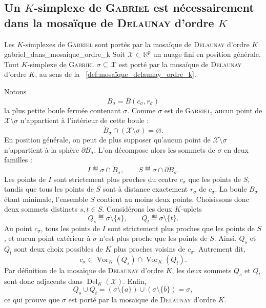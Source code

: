 \subsection{Un $K$-simplexe de \textsc{Gabriel} est nécessairement dans la mosaïque de \textsc{Delaunay} d'ordre $K$}

\begin{Theoreme}{Les $K$-simplexes de \textsc{Gabriel} sont portés par la mosaïque de \textsc{Delaunay} d'ordre $K$}{gabriel_dans_mosaique_ordre_k}
Soit $\mathcal X\subset\mathbb R^p$ un nuage fini en position générale.
Tout $K$-simplexe de \textsc{Gabriel} $\sigma\subseteq\mathcal X$ est porté par la mosaïque de \textsc{Delaunay} d'ordre $K$, au sens de la \Def~\ref{def:mosaïque_delaunay_ordre_k}.
\end{Theoreme}

\begin{Preuve} 
Notons
\[
    B_\sigma=\overline B(c_\sigma,r_\sigma)
\]
la plus petite boule fermée contenant $\sigma$.
Comme $\sigma$ est de \textsc{Gabriel}, aucun point de $\mathcal X\setminus\sigma$ n'appartient à l'intérieur de cette boule :
\[
    \mathring B_\sigma\cap(\mathcal X\setminus\sigma)=\varnothing.
\]
En position générale, on peut de plus supposer qu'aucun point de $\mathcal X\setminus\sigma$ n'appartient à la sphère $\partial B_\sigma$.
L'on décompose alors les sommets de $\sigma$ en deux familles :
\[
    I \eqdef \sigma\cap \mathring B_\sigma,
    \qquad
    S \eqdef \sigma\cap \partial \mathring B_\sigma.
\]
Les points de $I$ sont strictement plus proches du centre $c_\sigma$ que les points de $S$, tandis que tous les points de $S$ sont à distance exactement $r_\sigma$ de $c_\sigma$.
La boule $B_\sigma$ étant minimale, l'ensemble $S$ contient au moins deux points. Choisissons donc deux sommets distincts $s,t\in S$.
Considérons les deux $K$-uplets
\[
    Q_s \eqdef \sigma\setminus\{s\},
    \qquad
    Q_t \eqdef \sigma\setminus\{t\}.
\]
Au point $c_\sigma$, tous les points de $I$ sont strictement plus proches que les points de $S$, et aucun point extérieur à $\sigma$ n'est plus proche que les points de $S$.
Ainsi, $Q_s$ et $Q_t$ sont deux choix possibles de $K$ plus proches voisins de $c_\sigma$.
Autrement dit,
\[
    c_\sigma\in \operatorname{Vor}_K(Q_s)\cap \operatorname{Vor}_K(Q_t).
\]
Par définition de la mosaïque de \textsc{Delaunay} d'ordre $K$, les deux sommets $Q_s$ et $Q_t$ sont donc adjacents dans $\operatorname{Del}_K(\mathcal X)$.
Enfin,
\[
    Q_s\cup Q_t
    =
    (\sigma\setminus\{a\})\cup(\sigma\setminus\{b\})
    =
    \sigma,
\]
ce qui prouve que $\sigma$ est porté par la mosaïque de \textsc{Delaunay} d'ordre $K$.
\end{Preuve}

